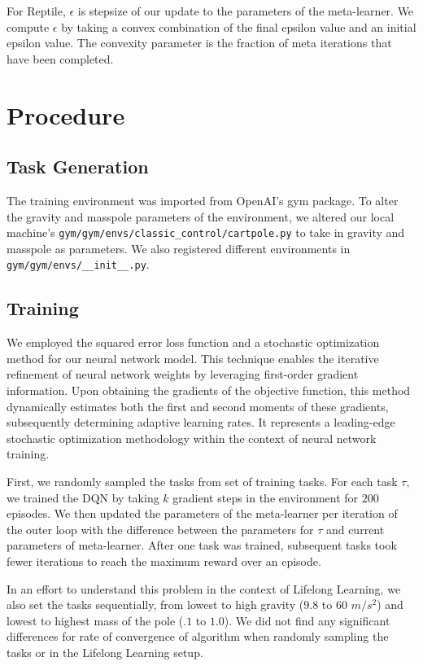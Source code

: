 \documentclass[runningheads]{llncs}
\begin{document}
\noindent For Reptile, $\epsilon$ is stepsize of our update to the parameters of the meta-learner. We compute $\epsilon$ by taking a convex combination of the final epsilon value and an initial epsilon value. The convexity parameter is the fraction of meta iterations that have been completed. 

\section{Procedure}
\subsection{Task Generation}
The training environment was imported from OpenAI’s gym package. To alter the gravity and masspole parameters of the environment, we altered our local machine's \verb|gym/gym/envs/classic_control/cartpole.py| to take in gravity and masspole as parameters. We also registered different environments in \verb|gym/gym/envs/__init__.py|.

\subsection{Training}
We employed the squared error loss function and a stochastic optimization method for our neural network model. This technique enables the iterative refinement of neural network weights by leveraging first-order gradient information. Upon obtaining the gradients of the objective function, this method dynamically estimates both the first and second moments of these gradients, subsequently determining adaptive learning rates. It represents a leading-edge stochastic optimization methodology within the context of neural network training.

First, we randomly sampled the tasks from set of training tasks. For each task $\tau$, we trained the DQN by taking $k$ gradient steps in the environment for $200$ episodes. We then updated the parameters of the meta-learner per iteration of the outer loop with the difference between the parameters for $\tau$ and current parameters of meta-learner.  After one task was trained, subsequent tasks took fewer iterations to reach the maximum reward over an episode. 

In an effort to understand this problem in the context of Lifelong Learning, we also set the tasks sequentially, from lowest to high gravity ($9.8$ to $60$ $m/s^2$) and lowest to highest mass of the pole ($.1$ to $1.0$). We did not find any significant differences for rate of convergence of algorithm when randomly sampling the tasks or in the Lifelong Learning setup. 
\end{document}
